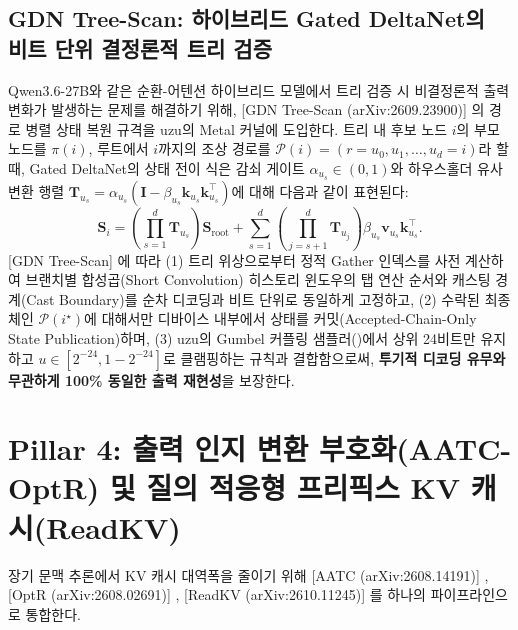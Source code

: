 \documentclass[10pt,a4paper]{article}
\begin{document}
\subsection{\textsf{GDN Tree-Scan}: 하이브리드 Gated DeltaNet의 비트 단위 결정론적 트리 검증}
\textsf{Qwen3.6-27B}와 같은 순환-어텐션 하이브리드 모델에서 트리 검증 시 비결정론적 출력 변화가 발생하는 문제를 해결하기 위해, [GDN Tree-Scan (arXiv:2609.23900)] \cite{ma2026gdntreescan}의 경로 병렬 상태 복원 규격을 \textsf{uzu}의 Metal 커널에 도입한다. 트리 내 후보 노드 $i$의 부모 노드를 $\pi(i)$, 루트에서 $i$까지의 조상 경로를 $\mathcal{P}(i) = (r = u_0, u_1, \dots, u_d = i)$라 할 때, Gated DeltaNet의 상태 전이 식은 감쇠 게이트 $\alpha_{u_s} \in (0, 1)$와 하우스홀더 유사 변환 행렬 $\mathbf{T}_{u_s} = \alpha_{u_s}(\mathbf{I} - \beta_{u_s} \mathbf{k}_{u_s} \mathbf{k}_{u_s}^\top)$에 대해 다음과 같이 표현된다:
\begin{equation}
\mathbf{S}_{i} = \left( \prod_{s=1}^{d} \mathbf{T}_{u_s} \right) \mathbf{S}_{\text{root}} + \sum_{s=1}^{d} \left( \prod_{j=s+1}^{d} \mathbf{T}_{u_j} \right) \beta_{u_s} \mathbf{v}_{u_s} \mathbf{k}_{u_s}^\top.
\label{eq:gdn_treescan}
\end{equation}
[GDN Tree-Scan] \cite{ma2026gdntreescan}에 따라 (1) 트리 위상으로부터 정적 Gather 인덱스를 사전 계산하여 브랜치별 합성곱(Short Convolution) 히스토리 윈도우의 탭 연산 순서와 캐스팅 경계(Cast Boundary)를 순차 디코딩과 비트 단위로 동일하게 고정하고, (2) 수락된 최종 체인 $\mathcal{P}(i^\star)$에 대해서만 디바이스 내부에서 상태를 커밋(Accepted-Chain-Only State Publication)하며, (3) \textsf{uzu}의 Gumbel 커플링 샘플러(\cite{mirai2026gumbel})에서 상위 24비트만 유지하고 $u \in [2^{-24}, 1-2^{-24}]$로 클램핑하는 규칙과 결합함으로써, \textbf{투기적 디코딩 유무와 무관하게 100\% 동일한 출력 재현성}을 보장한다.

\section{Pillar 4: 출력 인지 변환 부호화(\textsf{AATC-OptR}) 및 질의 적응형 프리픽스 KV 캐시(\textsf{ReadKV})}

장기 문맥 추론에서 KV 캐시 대역폭을 줄이기 위해 [AATC (arXiv:2608.14191)] \cite{laus2026aatc}, [OptR (arXiv:2608.02691)] \cite{yun2026optr}, [ReadKV (arXiv:2610.11245)] \cite{bhandari2026readkv}를 하나의 파이프라인으로 통합한다.
\end{document}
